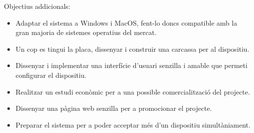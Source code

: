 Objectius addicionals:
\begin{itemize}
    \item Adaptar el sistema a Windows i MacOS, fent-lo doncs compatible amb la
    gran majoria de sistemes operatius del mercat.
    \item Un cop es tingui la placa, dissenyar i construir una carcassa per
    al dispositiu.
    \item Dissenyar i implementar una interfície d'usuari senzilla i amable
    que permeti configurar el dispositiu.
    \item Realitzar un estudi econòmic per a una possible comercialització del
    projecte.
    \item Dissenyar una pàgina web senzilla per a promocionar el projecte.
    \item Preparar el sistema per a poder acceptar més d'un dispositiu
    simultàniament.
\end{itemize}
